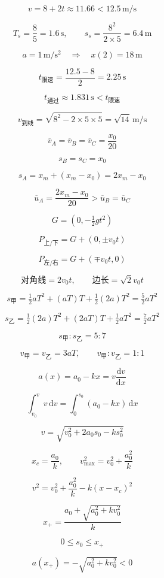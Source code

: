 \documentclass[12pt]{article}
\begin{document}
\[
v=8+2t\approx11.66<12.5\,\mathrm{m/s}
\]

\[
T_s=\frac85=1.6\,\mathrm s,\qquad s_s=\frac{8^2}{2\times5}=6.4\,\mathrm m
\]

\[
a=1\,\mathrm{m/s^2}\quad\Longrightarrow\quad x(2)=18\,\mathrm m
\]

\[
t_{\text{限速}}=\frac{12.5-8}{2}=2.25\,\mathrm s
\]

\[
t_{\text{通过}}\approx1.831\,\mathrm s<t_{\text{限速}}
\]

\[
v_{\text{到线}}=\sqrt{8^2-2\times5\times5}=\sqrt{14}\,\mathrm{m/s}
\]

\[
\boxed{\overline v_A=\overline v_B=\overline v_C=\frac{x_0}{20}}
\]

\[
s_B=s_C=x_0
\]

\[
s_A=x_m+(x_m-x_0)=2x_m-x_0
\]

\[
\boxed{\overline u_A=\frac{2x_m-x_0}{20}>\overline u_B=\overline u_C}
\]

\[
G=(0,-\tfrac12gt^2)
\]

\[
P_{\text{上/下}}=G+(0,\pm v_0t)
\]

\[
P_{\text{左/右}}=G+(\mp v_0t,0)
\]

\[
\text{对角线}=2v_0t,\qquad \text{边长}=\sqrt2v_0t
\]

\[
s_{\text{甲}}=\tfrac12aT^2+(aT)T+\tfrac12(2a)T^2=\tfrac52aT^2
\]

\[
s_{\text{乙}}=\tfrac12(2a)T^2+(2aT)T+\tfrac12aT^2=\tfrac72aT^2
\]

\[
\boxed{s_{\text{甲}}:s_{\text{乙}}=5:7}
\]

\[
v_{\text{甲}}=v_{\text{乙}}=3aT,\qquad\boxed{v_{\text{甲}}:v_{\text{乙}}=1:1}
\]

\[
a(x)=a_0-kx=v\frac{\mathrm dv}{\mathrm dx}
\]

\[
\int_{v_0}^v v\,\mathrm dv=\int_0^{s_0}(a_0-kx)\,\mathrm dx
\]

\[
\boxed{v=\sqrt{v_0^2+2a_0s_0-ks_0^2}}
\]

\[
x_c=\frac{a_0}{k},\qquad v_{\max}^2=v_0^2+\frac{a_0^2}{k}
\]

\[
v^2=v_0^2+\frac{a_0^2}{k}-k(x-x_c)^2
\]

\[
x_+=\frac{a_0+\sqrt{a_0^2+kv_0^2}}{k}
\]

\[
\boxed{0\le s_0\le x_+}
\]

\[
a(x_+)=-\sqrt{a_0^2+kv_0^2}<0
\]
\end{document}
